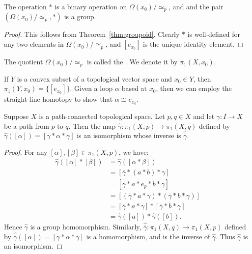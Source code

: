 \begin{theorem}
    The operation $\ast$ is a binary operation on $\Omega(x_0)/\simeq_p$, and and the pair $(\Omega(x_0)/\simeq_p,\ast)$ is a group.
\end{theorem}
    \begin{proof}
        This follows from Theorem~\ref{thm:groupoid}. Clearly $\ast$ is well-defined for any two elements in $\Omega(x_0)/\simeq_p$, and $[e_{x_0}]$ is the unique identity element.
    \end{proof}

\begin{definition}
    The quotient $\Omega(x_0)/\simeq_p$ is called the . We denote it by $\pi_1(X,x_0)$.
\end{definition}

\begin{example}
    If $Y$ is a convex subset of a topological vector space and $x_0 \in Y$, then $\pi_1(Y,x_0) = \{[e_{x_0}]\}$. Given a loop $\alpha$ based at $x_0$, then we can employ the straight-line homotopy to show that $\alpha \cong e_{x_0}$.
\end{example}

\begin{theorem}
    Suppose $X$ is a path-connected topological space. Let $p,q \in X$ and let $\gamma:I \rightarrow X$ be a path from $p$ to $q$. Then the map $\widehat{\gamma}:\pi_1(X,p) \rightarrow \pi_1(X,q)$ defined by $\widehat{\gamma}([\alpha]) = [\overline{\gamma}\ast \alpha \ast \gamma]$ is an isomorphism whose inverse is $\widehat{\overline{\gamma}}$.
\end{theorem}
    \begin{proof}
        For any $[\alpha], [\beta] \in \pi_1(X,p)$, we have:
            \begin{equation*}
            \begin{split}
                \widehat{\gamma}([\alpha] \ast [\beta])
                & = \widehat{\gamma}([\alpha \ast \beta]) \\
                & = [\overline{\gamma} \ast (a \ast b) \ast \gamma] \\
                & = [\overline{\gamma} \ast a \ast e_p \ast b \ast \gamma] \\
                & = [(\overline{\gamma} \ast a \ast \gamma )\ast (\overline{\gamma} \ast b \ast \gamma)] \\
                & = [\overline{\gamma} \ast a \ast \gamma] \ast [\overline{\gamma} \ast b \ast \gamma] \\
                & = \widehat{\gamma}([a]) \ast \widehat{\gamma}([b]).
            \end{split}
            \end{equation*}
        Hence $\widehat{\gamma}$ is a group homomorphism. Similarly, $\widehat{\overline{\gamma}}:\pi_1(X,q) \rightarrow \pi_1(X,p)$ defined by $\widehat{\overline{\gamma}}([\alpha]) = [\gamma \ast \alpha \ast \overline{\gamma}]$ is a homomorphism, and is the inverse of $\widehat{\gamma}$. Thus $\widehat{\gamma}$ is an isomorphism.
    \end{proof}

